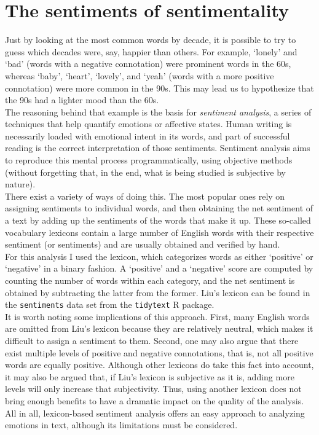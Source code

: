 \documentclass{article}
\begin{document}
\section*{The sentiments of sentimentality}


Just by looking at the most common words by decade, it is possible to try to guess which decades were, say, happier than others. For example, `lonely' and `bad' (words with a negative connotation) were prominent words in the 60s, whereas `baby', `heart', `lovely', and `yeah' (words with a more positive connotation) were more common in the 90s. This may lead us to hypothesize that the 90s had a lighter mood than the 60s. \\


The reasoning behind that example is the basis for \textit{sentiment analysis}, a series of techniques that help quantify emotions or affective states. Human writing is necessarily loaded with emotional intent in its words, and part of successful reading is the correct interpretation of those sentiments. Sentiment analysis aims to reproduce this mental process programmatically, using objective methods (without forgetting that, in the end, what is being studied is subjective by nature). \\



There exist a variety of ways of doing this. The most popular ones rely on assigning sentiments to individual words, and then obtaining the net sentiment of a text by adding up the sentiments of the words that make it up. These so-called vocabulary lexicons contain a large number of English words with their respective sentiment (or sentiments) and are usually obtained and verified by hand. \\




For this analysis I used the \cite{Liu_sentiments} lexicon, which categorizes words as either `positive' or `negative' in a binary fashion. A `positive' and a `negative' score are computed by counting the number of words within each category, and the net sentiment is obtained by subtracting the latter from the former. Liu's lexicon can be found in the \texttt{sentiments} data set from the \texttt{tidytext} \textsf{R} package. \\


It is worth noting some implications of this approach. First, many English words are omitted from Liu's lexicon because they are relatively neutral, which makes it difficult to assign a sentiment to them. Second, one may also argue that there exist multiple levels of positive and negative connotations, that is, not all positive words are equally positive. Although other lexicons do take this fact into account, it may also be argued that, if Liu's lexicon is subjective as it is, adding more levels will only increase that subjectivity. Thus, using another lexicon does not bring enough benefits to have a dramatic impact on the quality of the analysis. All in all, lexicon-based sentiment analysis offers an easy approach to analyzing emotions in text, although its limitations must be considered. \\
\end{document}
